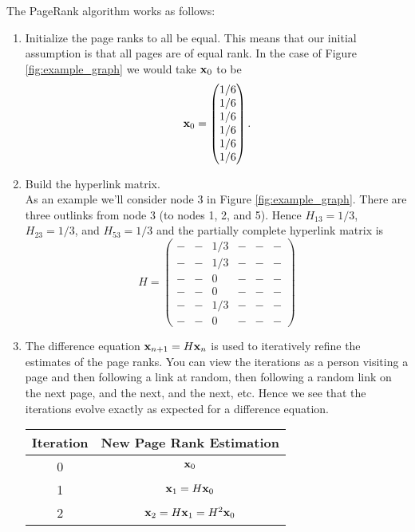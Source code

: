 The PageRank algorithm works as follows:
\begin{enumerate}
    \item Initialize the page ranks to all be equal. This means that our initial
        assumption is that all pages are of equal rank.  In the case of Figure
        \ref{fig:example_graph} we would take ${\bf x}_0$ to be 
        \[ {\bf x}_0 = \begin{pmatrix} 1/6 \\ 1/6 \\ 1/6 \\ 1/6 \\ 1/6 \\ 1/6 \end{pmatrix}. \]
    \item Build the hyperlink matrix.  \\ As an example we'll consider node 3 in Figure
        \ref{fig:example_graph}.  There are three outlinks from node 3 (to nodes 1, 2, and
        5).  Hence $H_{13}=1/3$, $H_{23} = 1/3$, and $H_{53} = 1/3$ and the partially
        complete hyperlink matrix is
        \[ H = \begin{pmatrix} 
                - & - & 1/3 & - & - & - \\
                - & - & 1/3 & - & - & - \\
                - & - & 0   & - & - & - \\
                - & - & 0   & - & - & - \\
                - & - & 1/3 & - & - & - \\
                - & - & 0   & - & - & - 
            \end{pmatrix} \]
    \item The difference equation ${\bf x}_{n+1} = H {\bf x}_n$ is used to iteratively refine the
        estimates of the page ranks.  You can view the iterations as a person visiting a
        page and then following a link at random, then following a random link on the next
        page, and the next, and the next, etc.  Hence we see
        that the iterations evolve exactly as expected for a difference equation.
        \begin{center}
            \begin{tabular}{|c|c|}
                \hline
                Iteration & New Page Rank Estimation \\ \hline \hline
                0 & ${\bf x}_0$ \\
                1 & ${\bf x}_1 = H {\bf x}_0$ \\
                2 & ${\bf x}_2 = H {\bf x}_1 = H^2 {\bf x}_0$ \\

\end{tabular}
\end{center}
\end{enumerate}
